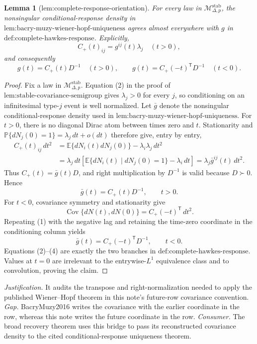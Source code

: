 \documentclass{article}
\newtheorem{lemma}{Lemma}
\begin{document}
\begin{lemma}[lem:complete-response-orientation]\label{lem:complete-response-orientation}
For every law in \(\mathcal M_{\Delta,p}^{\mathrm{stab}}\), the nonsingular conditional-response density in \(\text{lem:bacry-muzy-wiener-hopf-uniqueness}\) agrees almost everywhere with \(g\) in \(\text{def:complete-hawkes-response}\).  Explicitly,
\[
 C_{+}(t)_{ij}=g^{ij}(t)\lambda_j\quad(t>0),
\]
and consequently
\[
 g(t)=C_{+}(t)D^{-1}\quad(t>0),\qquad
 g(t)=C_{+}(-t)^{\mathsf T}D^{-1}\quad(t<0).
\]
\end{lemma}
\begin{proof}
Fix a law in \(\mathcal M_{\Delta,p}^{\mathrm{stab}}\).  Equation (2) in the proof of \(\text{lem:stable-covariance-semigroup}\) gives \(\lambda_j>0\) for every \(j\), so conditioning on an infinitesimal type-\(j\) event is well normalized.  Let \(\bar g\) denote the nonsingular conditional-response density used in \(\text{lem:bacry-muzy-wiener-hopf-uniqueness}\).  For \(t>0\), there is no diagonal Dirac atom between times zero and \(t\).  Stationarity and \(\mathbb P\{dN_j(0)=1\}=\lambda_j\,dt+o(dt)\) therefore give, entry by entry,
\[
 \begin{aligned}
 C_{+}(t)_{ij}\,dt^2
 &=\mathbb E\{dN_i(t)dN_j(0)\}-\lambda_i\lambda_j\,dt^2\\
 &=\lambda_j\,dt\left[
   \mathbb E\{dN_i(t)\mid dN_j(0)=1\}-\lambda_i\,dt
  \right]
 =\lambda_j\bar g^{ij}(t)\,dt^2.
 \end{aligned}
\tag{1}
\]
Thus \(C_{+}(t)=\bar g(t)D\), and right multiplication by \(D^{-1}\) is valid because \(D\succ0\).  Hence
\[
 \bar g(t)=C_{+}(t)D^{-1},\qquad t>0.
\tag{2}
\]
For \(t<0\), covariance symmetry and stationarity give
\[
 \operatorname{Cov}\{dN(t),dN(0)\}
 =C_{+}(-t)^{\mathsf T}\,dt^2.
\tag{3}
\]
Repeating (1) with the negative lag and retaining the time-zero coordinate in the conditioning column yields
\[
 \bar g(t)=C_{+}(-t)^{\mathsf T}D^{-1},\qquad t<0.
\tag{4}
\]
Equations (2)--(4) are exactly the two branches in \(\text{def:complete-hawkes-response}\).  Values at \(t=0\) are irrelevant to the entrywise-\(L^1\) equivalence class and to convolution, proving the claim.
\end{proof}
\par\smallskip\noindent \textit{Justification.} It audits the transpose and right-normalization needed to apply the published Wiener--Hopf theorem in this note's future-row covariance convention. \textit{Gap.} BacryMuzy2016 writes the covariance with the earlier coordinate in the row, whereas this note writes the future coordinate in the row. \textit{Consumer.} The broad recovery theorem uses this bridge to pass its reconstructed covariance density to the cited conditional-response uniqueness theorem.
\end{document}
